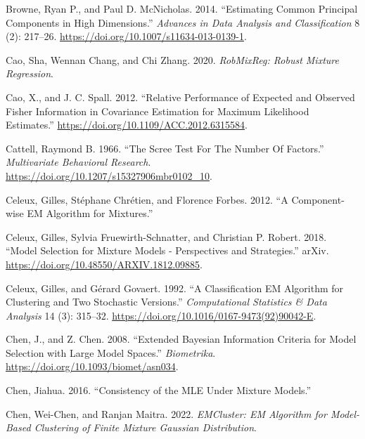 \begin{CSLReferences}{1}{0}
\leavevmode{}%
Browne, Ryan P., and Paul D. McNicholas. 2014. {``Estimating Common Principal Components in High Dimensions.''} \emph{Advances in Data Analysis and Classification} 8 (2): 217--26. \url{https://doi.org/10.1007/s11634-013-0139-1}.

\leavevmode{}%
Cao, Sha, Wennan Chang, and Chi Zhang. 2020. \emph{RobMixReg: Robust Mixture Regression}.

\leavevmode{}%
Cao, X., and J. C. Spall. 2012. {``Relative Performance of Expected and Observed Fisher Information in Covariance Estimation for Maximum Likelihood Estimates.''} \url{https://doi.org/10.1109/ACC.2012.6315584}.

\leavevmode{}%
Cattell, Raymond B. 1966. {``The {Scree} {Test} {For} {The} {Number} {Of} {Factors}.''} \emph{Multivariate Behavioral Research}. \url{https://doi.org/10.1207/s15327906mbr0102_10}.

\leavevmode{}%
Celeux, Gilles, Stéphane Chrétien, and Florence Forbes. 2012. {``A {Component-wise EM Algorithm} for {Mixtures}.''}

\leavevmode{}%
Celeux, Gilles, Sylvia Fruewirth-Schnatter, and Christian P. Robert. 2018. {``Model Selection for Mixture Models - Perspectives and Strategies.''} arXiv. \url{https://doi.org/10.48550/ARXIV.1812.09885}.

\leavevmode{}%
Celeux, Gilles, and Gérard Govaert. 1992. {``A Classification {EM} Algorithm for Clustering and Two Stochastic Versions.''} \emph{Computational Statistics \& Data Analysis} 14 (3): 315--32. \url{https://doi.org/10.1016/0167-9473(92)90042-E}.

\leavevmode{}%
Chen, J., and Z. Chen. 2008. {``Extended {Bayesian} Information Criteria for Model Selection with Large Model Spaces.''} \emph{Biometrika}. \url{https://doi.org/10.1093/biomet/asn034}.

\leavevmode{}%
Chen, Jiahua. 2016. {``Consistency of the {MLE} Under Mixture Models.''}

\leavevmode{}%
Chen, Wei-Chen, and Ranjan Maitra. 2022. \emph{EMCluster: EM Algorithm for Model-Based Clustering of Finite Mixture Gaussian Distribution}.


\end{CSLReferences}
